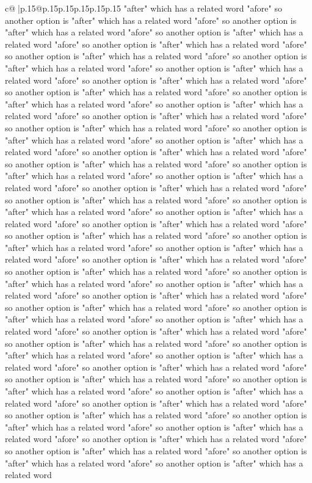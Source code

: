 \documentclass{article}
\begin{document}
{\begin{supertabular}{c@{$\;$}|p{.15\linewidth}@{}p{.15\linewidth}p{.15\linewidth}p{.15\linewidth}p{.15\linewidth}p{.15\linewidth}}
{{{"after" which has a related word "afore" so another option is "after" which has a related word "afore" so another option is "after" which has a related word "afore" so another option is "after" which has a related word "afore" so another option is "after" which has a related word "afore" so another option is "after" which has a related word "afore" so another option is "after" which has a related word "afore" so another option is "after" which has a related word "afore" so another option is "after" which has a related word "afore" so another option is "after" which has a related word "afore" so another option is "after" which has a related word "afore" so another option is "after" which has a related word "afore" so another option is "after" which has a related word "afore" so another option is "after" which has a related word "afore" so another option is "after" which has a related word "afore" so another option is "after" which has a related word "afore" so another option is "after" which has a related word "afore" so another option is "after" which has a related word "afore" so another option is "after" which has a related word "afore" so another option is "after" which has a related word "afore" so another option is "after" which has a related word "afore" so another option is "after" which has a related word "afore" so another option is "after" which has a related word "afore" so another option is "after" which has a related word "afore" so another option is "after" which has a related word "afore" so another option is "after" which has a related word "afore" so another option is "after" which has a related word "afore" so another option is "after" which has a related word "afore" so another option is "after" which has a related word "afore" so another option is "after" which has a related word "afore" so another option is "after" which has a related word "afore" so another option is "after" which has a related word "afore" so another option is "after" which has a related word "afore" so another option is "after" which has a related word "afore" so another option is "after" which has a related word "afore" so another option is "after" which has a related word "afore" so another option is "after" which has a related word "afore" so another option is "after" which has a related word "afore" so another option is "after" which has a related word "afore" so another option is "after" which has a related word "afore" so another option is "after" which has a related word "afore" so another option is "after" which has a related word "afore" so another option is "after" which has a related word "afore" so another option is "after" which has a related word "afore" so another option is "after" which has a related word "afore" so another option is "after" which has a related word "afore" so another option is "after" which has a related word "afore" so another option is "after" which has a related word "afore" so another option is "after" which has a related word "afore" so another option is "after" which has a related word "afore" so another option is "after" which has a related word "afore" so another option is "after" which has a related word }}}
\end{supertabular}}
\end{document}
